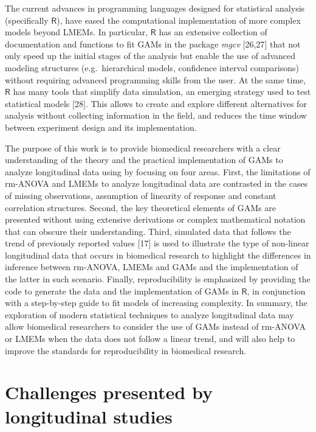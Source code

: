 \documentclass[
]{article}
\begin{document}
The current advances in programming languages designed for statistical analysis (specifically \(\textsf{R}\)), have eased the computational implementation of more complex models beyond LMEMs. In particular, \(\textsf{R}\) has an extensive collection of documentation and functions to fit GAMs in the package \emph{mgcv} {[}26,27{]} that not only speed up the initial stages of the analysis but enable the use of advanced modeling structures (e.g.~hierarchical models, confidence interval comparisons) without requiring advanced programming skills from the user. At the same time, \(\textsf{R}\) has many tools that simplify data simulation, an emerging strategy used to test statistical models {[}28{]}. This allows to create and explore different alternatives for analysis without collecting information in the field, and reduces the time window between experiment design and its implementation.

The purpose of this work is to provide biomedical researchers with a clear understanding of the theory and the practical implementation of GAMs to analyze longitudinal data using by focusing on four areas. First, the limitations of rm-ANOVA and LMEMs to analyze longitudinal data are contrasted in the cases of missing observations, assumption of linearity of response and constant correlation structures. Second, the key theoretical elements of GAMs are presented without using extensive derivations or complex mathematical notation that can obscure their understanding. Third, simulated data that follows the trend of previously reported values {[}17{]} is used to illustrate the type of non-linear longitudinal data that occurs in biomedical research to highlight the differences in inference between rm-ANOVA, LMEMs and GAMs and the implementation of the latter in such scenario. Finally, reproducibility is emphasized by providing the code to generate the data and the implementation of GAMs in \(\textsf{R}\), in conjunction with a step-by-step guide to fit models of increasing complexity. In summary, the exploration of modern statistical techniques to analyze longitudinal data may allow biomedical researchers to consider the use of GAMs instead of rm-ANOVA or LMEMs when the data does not follow a linear trend, and will also help to improve the standards for reproducibility in biomedical research.

\hypertarget{challenges-presented-by-longitudinal-studies}{%
\section{Challenges presented by longitudinal studies}\label{challenges-presented-by-longitudinal-studies}}
\end{document}
